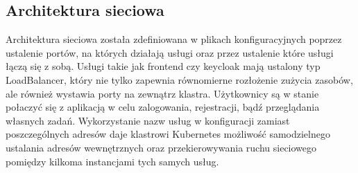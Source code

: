 \documentclass[12pt,a4paper]{article}
\begin{document}
\subsection{Architektura sieciowa}
\label{sec:ExampleResults}

Architektura sieciowa została zdefiniowana w plikach konfiguracyjnych poprzez ustalenie portów, na których działają usługi oraz przez ustalenie które usługi łączą się z sobą. Usługi takie jak frontend czy keycloak mają ustalony typ LoadBalancer, który nie tylko zapewnia równomierne rozłożenie zużycia zasobów, ale również wystawia porty na zewnątrz klastra. Użytkownicy są w stanie połaczyć się z aplikacją w celu zalogowania, rejestracji, bądź przeglądania własnych zadań. Wykorzystanie nazw usług w konfiguracji zamiast poszczególnych adresów daje klastrowi Kubernetes możliwość samodzielnego ustalania adresów wewnętrznych oraz przekierowywania ruchu sieciowego pomiędzy kilkoma instancjami tych samych usług.

\noindent



\nocite{*}
\end{document}
